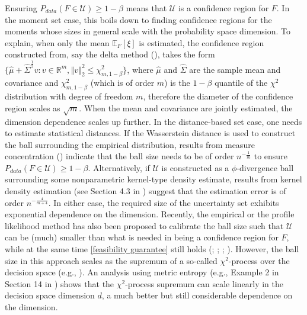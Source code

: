\documentclass[mnsc,blindrev]{informs4} %
\newcommand{\R}{\mathbb{R}}
\newcommand{\norm}[1]{\left \Vert #1 \right\Vert}
\begin{document}
\begin{example}
Ensuring $P_{data}(F\in\mathcal U)\geq1-\beta$ means that $\mathcal U$ is a confidence region for $F$. In the moment set case, this boils down to finding confidence regions for the moments whose sizes in general scale with the probability space dimension. To explain, when only the mean $\mathbb E_{F}[\xi]$ is estimated, the confidence region constructed from, say the delta method (\cite{marandi2019extending}), takes the form $\{\hat{\mu}+\hat{\Sigma}^{\frac{1}{2}}v:v\in\R^m,\norm{v}_2^2\leq \chi_{m,1-\beta}^2\}$, where $\hat{\mu}$ and $\hat{\Sigma}$ are the sample mean and covariance and $\chi_{m,1-\beta}^2$ (which is of order $m$) is the $1-\beta$ quantile of the $\chi^2$ distribution with degree of freedom $m$, therefore the diameter of the confidence region scales as $\sqrt{m}$. When the mean and covariance are jointly estimated, the dimension dependence scales up further. In the distance-based set case, one needs to estimate statistical distances. If the Wasserstein distance is used to construct the ball surrounding the empirical distribution, results from measure concentration (\cite{fournier2015rate}) indicate that the ball size needs to be of order $n^{-\frac{1}{m}}$ to ensure $P_{data}(F\in\mathcal U)\geq1-\beta$. Alternatively, if $\mathcal U$ is constructed as a $\phi$-divergence ball surrounding some nonparametric kernel-type density estimate, results from kernel density estimation (see Section 4.3 in \cite{wand1994kernel}) suggest that the estimation error is of order $n^{-\frac{4}{m+4}}$. In either case, the required size of the uncertainty set exhibits exponential dependence on the dimension. Recently, the empirical or the profile likelihood method has also been proposed to calibrate the ball size such that $\mathcal U$ can be (much) smaller than what is needed in being a confidence region for $F$, while at the same time \eqref{feasibility guarantee} still holds (\cite{lam2017empirical}; \cite{duchi2016statistics}; \cite{lam2016recovering}; \cite{blanchet2016sample}). However, the ball size in this approach scales as the supremum of a so-called $\chi^2$-process over the decision space (e.g., \cite{lam2016recovering}). An analysis using metric entropy (e.g., Example 2 in Section 14 in \cite{lifshits2013gaussian}) shows that the $\chi^2$-process supremum can scale linearly in the decision space dimension $d$, a much better but still considerable dependence on the dimension.\hfill\halmos
\end{example}
\end{document}
